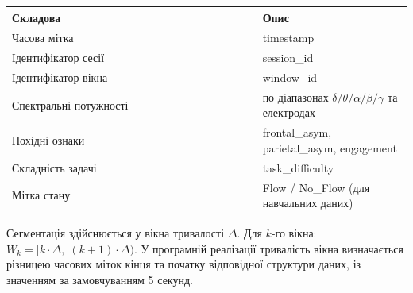 \documentclass[12pt,a4paper]{article}
\begin{document}
{\def\LTcaptype{none} %

\begin{longtable}[]{@{}

  >{\raggedright\arraybackslash}p{0.6250\linewidth}

  >{\raggedright\arraybackslash}p{0.3750\linewidth}@{}}

\toprule\noalign{}

\begin{minipage}[b]{\linewidth}\raggedright

Складова

\end{minipage} & \begin{minipage}[b]{\linewidth}\raggedright

Опис

\end{minipage} \\

\midrule\noalign{}

\endhead

\bottomrule\noalign{}

\endlastfoot

Часова мітка & timestamp \\

Ідентифікатор сесії & session\_id \\

Ідентифікатор вікна & window\_id \\

Спектральні потужності & по діапазонах \(\delta/\theta/\alpha/\beta/\gamma\) та електродах \\

Похідні ознаки & frontal\_asym, parietal\_asym, engagement \\

Складність задачі & task\_difficulty \\

Мітка стану & Flow / No\_Flow (для навчальних даних) \\

\end{longtable}

}



Сегментація здійснюється у вікна тривалості \(\Delta\). Для \(k\)-го вікна: \(W_k = [k \cdot \Delta,\;(k+1) \cdot \Delta)\). У програмній реалізації тривалість вікна визначається різницею часових міток кінця та початку відповідної структури даних, із значенням за замовчуванням 5 секунд.
\end{document}
